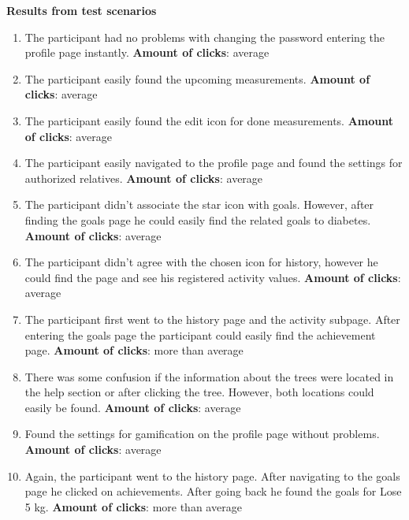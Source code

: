 \noindent\textbf{Results from test scenarios}
\begin{enumerate}
\item The participant had no problems with changing the password entering the profile page instantly. 
\subitem \textbf{Amount of clicks}: average
\item The participant easily found the upcoming measurements.
\subitem \textbf{Amount of clicks}: average
\item The participant easily found the edit icon for done measurements. 
\subitem \textbf{Amount of clicks}: average
\item The participant easily navigated to the profile page and found the settings for authorized relatives.
\subitem \textbf{Amount of clicks}: average
\item The participant didn’t associate the star icon with goals. However, after finding the goals page he could easily find the related goals to diabetes. 
\subitem \textbf{Amount of clicks}: average
\item The participant didn’t agree with the chosen icon for history, however he could find the page and see his registered activity values.
\subitem \textbf{Amount of clicks}: average
\item The participant first went to the history page and the activity subpage. After entering the goals page the participant could easily find the achievement page.
\subitem \textbf{Amount of clicks}: more than average
\item There was some confusion if the information about the trees were located in the help section or after clicking the tree. However, both locations could easily be found.
\subitem \textbf{Amount of clicks}: average
\item Found the settings for gamification on the profile page without problems.
\subitem \textbf{Amount of clicks}: average
\item Again, the participant went to the history page. After navigating to the goals page he clicked on achievements. After going back he found the goals for Lose 5 kg. 
\subitem \textbf{Amount of clicks}: more than average
\end{enumerate}



